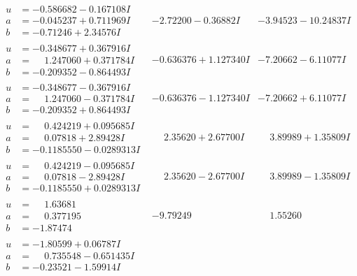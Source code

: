 \documentclass[1p]{elsarticle_modified}
\theoremstyle{definition}
\begin{document}
$$\begin{array}{c|c|c}
\begin{aligned}
u &= -0.586682 - 0.167108 I \\
a &= -0.045237 + 0.711969 I \\
b &= -0.71246 + 2.34576 I\end{aligned}
 & -2.72200 - 0.36882 I & -3.94523 - 10.24837 I \\ \hline\begin{aligned}
u &= -0.348677 + 0.367916 I \\
a &= \phantom{-}1.247060 + 0.371784 I \\
b &= -0.209352 - 0.864493 I\end{aligned}
 & -0.636376 + 1.127340 I & -7.20662 - 6.11077 I \\ \hline\begin{aligned}
u &= -0.348677 - 0.367916 I \\
a &= \phantom{-}1.247060 - 0.371784 I \\
b &= -0.209352 + 0.864493 I\end{aligned}
 & -0.636376 - 1.127340 I & -7.20662 + 6.11077 I \\ \hline\begin{aligned}
u &= \phantom{-}0.424219 + 0.095685 I \\
a &= \phantom{-}0.07818 + 2.89428 I \\
b &= -0.1185550 - 0.0289313 I\end{aligned}
 & \phantom{-}2.35620 + 2.67700 I & \phantom{-}3.89989 + 1.35809 I \\ \hline\begin{aligned}
u &= \phantom{-}0.424219 - 0.095685 I \\
a &= \phantom{-}0.07818 - 2.89428 I \\
b &= -0.1185550 + 0.0289313 I\end{aligned}
 & \phantom{-}2.35620 - 2.67700 I & \phantom{-}3.89989 - 1.35809 I \\ \hline\begin{aligned}
u &= \phantom{-}1.63681\phantom{ +0.000000I} \\
a &= \phantom{-}0.377195\phantom{ +0.000000I} \\
b &= -1.87474\phantom{ +0.000000I}\end{aligned}
 & -9.79249\phantom{ +0.000000I} & \phantom{-}1.55260\phantom{ +0.000000I} \\ \hline\begin{aligned}
u &= -1.80599 + 0.06787 I \\
a &= \phantom{-}0.735548 - 0.651435 I \\
b &= -0.23521 - 1.59914 I\end{aligned}

\end{array}$$
\end{document}
